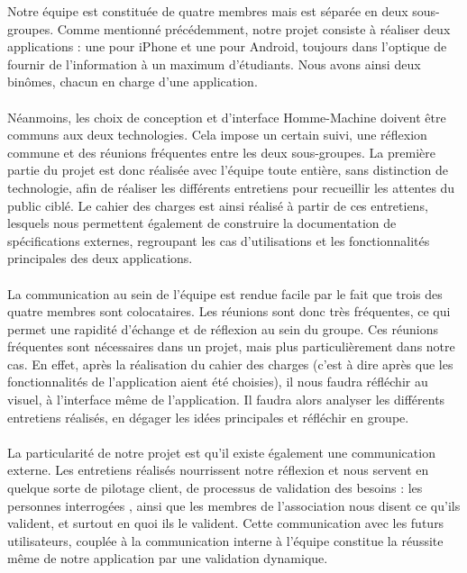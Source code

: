 \documentclass[a4paper,11px]{article}
\begin{document}



\indent Notre équipe est constituée de quatre membres mais est séparée en deux sous-groupes. Comme mentionné précédemment, notre projet consiste à réaliser deux applications : une pour iPhone et une pour Android, toujours dans l'optique de fournir de l'information à un maximum d'étudiants. Nous avons ainsi deux binômes, chacun en charge d'une application.\\
\\
\indent Néanmoins, les choix de conception et d'interface Homme-Machine doivent être communs aux deux technologies. Cela impose un certain suivi, une réflexion commune et des réunions fréquentes entre les deux sous-groupes. La première partie du projet est donc réalisée avec l'équipe toute entière, sans distinction de technologie, afin de réaliser les différents entretiens pour recueillir les attentes du public ciblé. Le cahier des charges est ainsi réalisé à partir de ces entretiens, lesquels nous permettent également de construire la documentation de spécifications externes, regroupant les cas d'utilisations et les fonctionnalités principales des deux applications.\\
\\
\indent La communication au sein de l'équipe est rendue facile par le fait que trois des quatre membres sont colocataires. Les réunions sont donc très fréquentes, ce qui permet une rapidité d'échange et de réflexion au sein du groupe. Ces réunions fréquentes sont nécessaires dans un projet, mais plus particulièrement dans notre cas. En effet, après la réalisation du cahier des charges (c'est à dire après que les fonctionnalités de l'application aient été choisies), il nous faudra réfléchir au visuel, à l'interface même de l'application. Il faudra alors analyser les différents entretiens réalisés, en dégager les idées principales et réfléchir en groupe.\\
\\
\indent La particularité de notre projet est qu'il existe également une communication externe. Les entretiens réalisés nourrissent notre réflexion et nous servent en quelque sorte de pilotage client, de processus de validation des besoins : les personnes interrogées , ainsi que les membres de l'association nous disent ce qu'ils valident, et surtout en quoi ils le valident. Cette communication avec les futurs utilisateurs, couplée à la communication interne à l'équipe constitue la réussite même de notre application par une validation dynamique.

\end{document}
